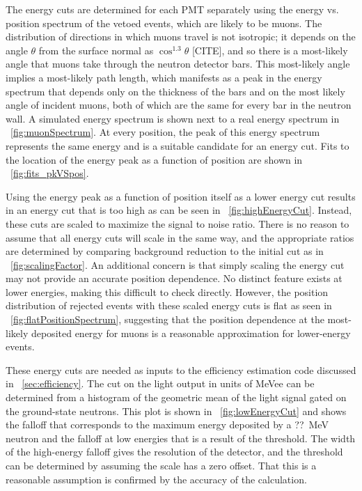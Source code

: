 The energy cuts are determined for each PMT separately using the energy vs. position spectrum of the vetoed events, which are likely to be muons.  The distribution of directions in which muons travel is not isotropic; it depends on the angle $\theta$ from the surface normal as $\cos^{1.3}{\theta}$ [CITE], and so there is a most-likely angle that muons take through the neutron detector bars.  This most-likely angle implies a most-likely path length, which manifests as a peak in the energy spectrum that depends only on the thickness of the bars and on the most likely angle of incident muons, both of which are the same for every bar in the neutron wall.  A simulated energy spectrum is shown next to a real energy spectrum in {\fig}~\ref{fig:muonSpectrum}.  At every position, the peak of this energy spectrum represents the same energy and is a suitable candidate for an energy cut.  Fits to the location of the energy peak as a function of position are shown in {\fig}~\ref{fig:fits_pkVSpos}.

Using the energy peak as a function of position itself as a lower energy cut results in an energy cut that is too high as can be seen in {\fig}~\ref{fig:highEnergyCut}.  Instead, these cuts are scaled to maximize the signal to noise ratio.  There is no reason to assume that all energy cuts will scale in the same way, and the appropriate ratios are determined by comparing background reduction to the initial cut as in {\fig}~\ref{fig:scalingFactor}.  An additional concern is that simply scaling the energy cut may not provide an accurate position dependence.  No distinct feature exists at lower energies, making this difficult to check directly.  However, the position distribution of rejected events with these scaled energy cuts is flat as seen in {\fig}~\ref{fig:flatPositionSpectrum}, suggesting that the position dependence at the most-likely deposited energy for muons is a reasonable approximation for lower-energy events.

These energy cuts are needed as inputs to the efficiency estimation code discussed in {\sect}~\ref{sec:efficiency}.  The cut on the light output in units of MeVee can be determined from a histogram of the geometric mean of the light signal gated on the ground-state neutrons.  This plot is shown in {\fig}~\ref{fig:lowEnergyCut} and shows the falloff that corresponds to the maximum energy deposited by a ??~MeV neutron and the falloff at low energies that is a result of the threshold.  The width of the high-energy falloff gives the resolution of the detector, and the threshold can be determined by assuming the scale has a zero offset.  That this is a reasonable assumption is confirmed by the accuracy of the calculation.  

